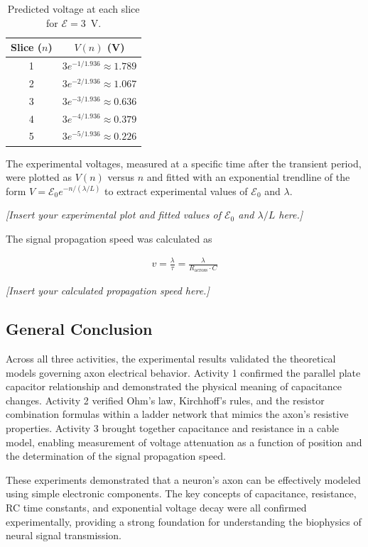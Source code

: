\message{ !name(lab_report.tex)}\documentclass[12pt]{article}
\begin{document}
\begin{table}[H]
\centering
\begin{tabular}{@{}cc@{}}
\toprule
Slice ($n$) & $V(n)$ (V) \\ \midrule
1 & $3e^{-1/1.936} \approx 1.789$ \\
2 & $3e^{-2/1.936} \approx 1.067$ \\
3 & $3e^{-3/1.936} \approx 0.636$ \\
4 & $3e^{-4/1.936} \approx 0.379$ \\
5 & $3e^{-5/1.936} \approx 0.226$ \\
\bottomrule
\end{tabular}
\caption{Predicted voltage at each slice for $\mathcal{E} = 3$~V.}
\end{table}

The experimental voltages, measured at a specific time after the transient period, were plotted as $V(n)$ versus $n$ and fitted with an exponential trendline of the form $V = \mathcal{E}_0 e^{-n/(\lambda/L)}$ to extract experimental values of $\mathcal{E}_0$ and $\lambda$.

\textit{[Insert your experimental plot and fitted values of $\mathcal{E}_0$ and $\lambda/L$ here.]}

The signal propagation speed was calculated as

\begin{align*}
    v = \frac{\lambda}{\tau} = \frac{\lambda}{R_{\text{across}} \cdot C}
\end{align*}

\textit{[Insert your calculated propagation speed here.]}

\subsection{General Conclusion}

Across all three activities, the experimental results validated the theoretical models governing axon electrical behavior. Activity 1 confirmed the parallel plate capacitor relationship and demonstrated the physical meaning of capacitance changes. Activity 2 verified Ohm's law, Kirchhoff's rules, and the resistor combination formulas within a ladder network that mimics the axon's resistive properties. Activity 3 brought together capacitance and resistance in a cable model, enabling measurement of voltage attenuation as a function of position and the determination of the signal propagation speed.

These experiments demonstrated that a neuron's axon can be effectively modeled using simple electronic components. The key concepts of capacitance, resistance, RC time constants, and exponential voltage decay were all confirmed experimentally, providing a strong foundation for understanding the biophysics of neural signal transmission.
\end{document}
